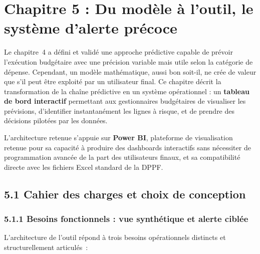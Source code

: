 \section*{Chapitre 5 : Du mod\`ele \`a l'outil, le syst\`eme d'alerte pr\'ecoce}

\bigskip

Le chapitre~4 a d\'efini et valid\'e une approche pr\'edictive capable de
pr\'evoir l'ex\'ecution budg\'etaire avec une pr\'ecision variable mais utile selon
la cat\'egorie de d\'epense. Cependant, un mod\`ele math\'ematique, aussi bon
soit-il, ne crée de valeur que s'il peut \^etre exploit\'e par un utilisateur final.
Ce chapitre d\'ecrit la transformation de la cha\^ine pr\'edictive en un syst\`eme 
op\'erationnel : un \textbf{tableau de bord interactif} permettant aux gestionnaires
budg\'etaires de visualiser les pr\'evisions, d'identifier instantan\'ement les lignes
\`a risque, et de prendre des d\'ecisions pilot\'ees par les donn\'ees. 

L'architecture retenue s'appuie sur \textbf{Power BI}, plateforme de visualisation
retenue pour sa capacit\'e \`a produire des dashboards interactifs sans n\'ecessiter
de programmation avanc\'ee de la part des utilisateurs finaux, et sa compatibilit\'e
directe avec les fichiers Excel standard de la DPPF.

\subsection*{5.1 \quad Cahier des charges et choix de conception}

\subsubsection*{5.1.1 \quad Besoins fonctionnels : vue synth\'etique et alerte cibl\'ee}

L'architecture de l'outil répond à trois besoins opérationnels distincts et
structurellement articulés~:

